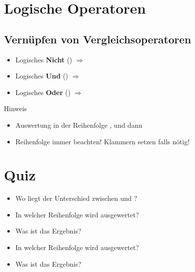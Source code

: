 \livecoding

\section{Logische Operatoren}
\subsection{Vernüpfen von Vergleichsoperatoren}
\begin{frame}
    \slidehead
    \pause
    \begin{itemize}[<+->]
        \item Logisches \textbf{Nicht} ()  $\Rightarrow$ 
        \item Logisches \textbf{Und} () $\Rightarrow$ 
        \item Logisches \textbf{Oder} ()  $\Rightarrow$ 
    \end{itemize}
    \pause
    \pause
    \begin{block}{Hinweis}
        \begin{itemize}[<+->]
            \item Auswertung in der Reihenfolge ,  und dann 
            \item Reihenfolge immer beachten!
                Klammern setzen falls nötig!
        \end{itemize}
    \end{block}
\end{frame}

\livecoding


\section{Quiz}
\begin{frame}
    \slidehead
    \begin{itemize}[<+->]
        \item Wo liegt der Unterschied zwischen  und ?
        \item In welcher Reihenfolge wird  ausgewertet?
        \item Was ist das Ergebnis?
        \item In welcher Reihenfolge wird  ausgewertet?
        \item Was ist das Ergebnis?
    \end{itemize}
\end{frame}


